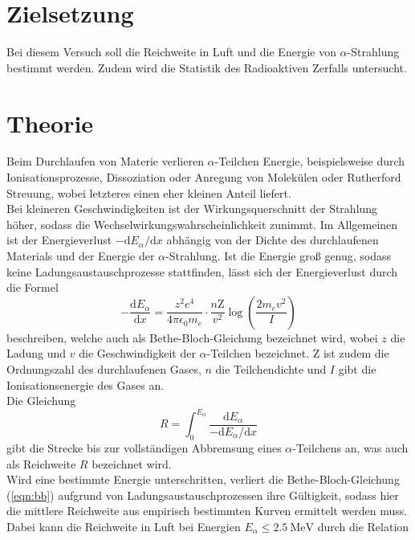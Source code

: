 \section{Zielsetzung}
Bei diesem Versuch soll die Reichweite in Luft und die Energie von
$\alpha$-Strahlung bestimmt werden.
Zudem wird die Statistik des Radioaktiven Zerfalls untersucht.


\section{Theorie}
\label{sec:Theorie}
Beim Durchlaufen von Materie verlieren $\alpha$-Teilchen Energie, beispielsweise
durch Ionisationsprozesse, Dissoziation oder Anregung von Molekülen oder Rutherford
Streuung, wobei letzteres einen eher kleinen Anteil liefert. \\
Bei kleineren Geschwindigkeiten ist der Wirkungsquerschnitt der Strahlung höher,
sodass die Wechselwirkungswahrscheinlichkeit zunimmt. Im Allgemeinen ist der
Energieverlust $-\text{d}E_{\alpha}/\text{d}x$ abhängig von der Dichte des durchlaufenen
Materials und der Energie der $\alpha$-Strahlung.
Ist die Energie groß genug, sodass keine Ladungsaustauschprozesse stattfinden,
lässt sich der Energieverlust durch die
Formel
\begin{equation}
  -\frac{\text{d}E_{\alpha}}{\text{d}x}=\frac{z^2 e^4}{4\pi\epsilon_0m_e}\cdot
  \frac{n\text{Z}}{v^2}\log{\left(\frac{2m_e v^2}{I}\right)}
  \label{eqn:bb}
\end{equation}
beschreiben, welche auch als Bethe-Bloch-Gleichung bezeichnet wird, wobei $z$ die
Ladung und $v$ die Geschwindigkeit der $\alpha$-Teilchen bezeichnet. Z ist zudem
die Ordnungszahl des durchlaufenen Gases, $n$ die Teilchendichte und $I$ gibt
die Ionisationsenergie des Gases an.\\
Die Gleichung
\begin{equation}
  R = \int_0^{E_{\alpha}} \frac{\text{d}E_{\alpha}}{-\text{d}E_{\alpha}/\text{d}x}
  \label{eqn:weg}
\end{equation}
gibt die Strecke bis zur vollständigen Abbremsung eines $\alpha$-Teilchens an,
was auch als Reichweite $R$ bezeichnet wird.\\
Wird eine bestimmte Energie unterschritten, verliert die Bethe-Bloch-Gleichung
(\ref{eqn:bb}) aufgrund von Ladungsaustauschprozessen ihre Gültigkeit, sodass hier
die mittlere Reichweite aus empirisch bestimmten Kurven ermittelt werden muss.
Dabei kann die Reichweite in Luft bei Energien $E_{\alpha} \leq \SI{2.5}{\mega\electronvolt}$
durch die Relation
